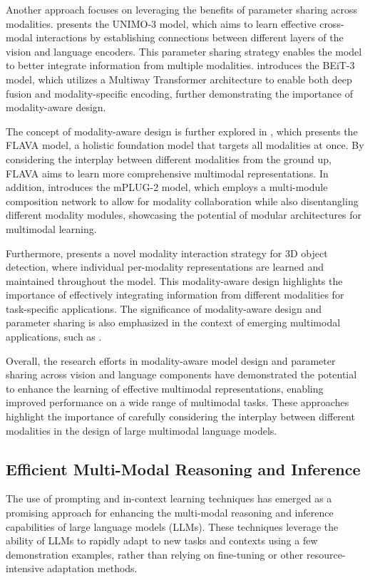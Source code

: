 \documentclass[11pt]{article}
\begin{document}
Another approach focuses on leveraging the benefits of parameter sharing across modalities. \cite{ref138} presents the UNIMO-3 model, which aims to learn effective cross-modal interactions by establishing connections between different layers of the vision and language encoders. This parameter sharing strategy enables the model to better integrate information from multiple modalities. \cite{ref139} introduces the BEiT-3 model, which utilizes a Multiway Transformer architecture to enable both deep fusion and modality-specific encoding, further demonstrating the importance of modality-aware design.

The concept of modality-aware design is further explored in \cite{ref27}, which presents the FLAVA model, a holistic foundation model that targets all modalities at once. By considering the interplay between different modalities from the ground up, FLAVA aims to learn more comprehensive multimodal representations. In addition, \cite{ref140} introduces the mPLUG-2 model, which employs a multi-module composition network to allow for modality collaboration while also disentangling different modality modules, showcasing the potential of modular architectures for multimodal learning.

Furthermore, \cite{ref141} presents a novel modality interaction strategy for 3D object detection, where individual per-modality representations are learned and maintained throughout the model. This modality-aware design highlights the importance of effectively integrating information from different modalities for task-specific applications. The significance of modality-aware design and parameter sharing is also emphasized in the context of emerging multimodal applications, such as \cite{ref17}.

Overall, the research efforts in modality-aware model design and parameter sharing across vision and language components have demonstrated the potential to enhance the learning of effective multimodal representations, enabling improved performance on a wide range of multimodal tasks. These approaches highlight the importance of carefully considering the interplay between different modalities in the design of large multimodal language models.

\subsection{Efficient Multi-Modal Reasoning and Inference}

The use of prompting and in-context learning techniques has emerged as a promising approach for enhancing the multi-modal reasoning and inference capabilities of large language models (LLMs). These techniques leverage the ability of LLMs to rapidly adapt to new tasks and contexts using a few demonstration examples, rather than relying on fine-tuning or other resource-intensive adaptation methods.
\end{document}

